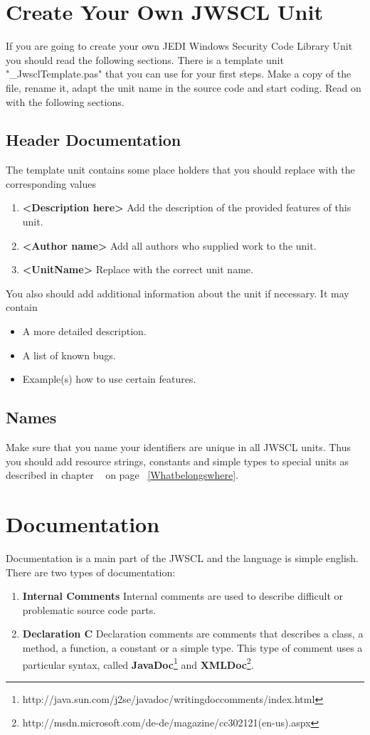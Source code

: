 \documentclass[a4paper,oneside,10pt]{article}
\begin{document}
\section{Create Your Own JWSCL Unit}
If you are going to create your own JEDI Windows Security Code Library Unit you should read the following sections. There is a template unit "\_JwsclTemplate.pas" that you can use for your first steps. Make a copy of the file, rename it, adapt the unit name in the source code and start coding. Read on with the following sections.

\subsection{Header Documentation}
The template unit contains some place holders that you should replace with the corresponding values
\begin{enumerate}
	\item \textbf{<Description here>} Add the description of the provided features of this unit.
  \item \textbf{<Author name>} Add all authors who supplied work to the unit.
  \item \textbf{<UnitName>} Replace with the correct unit name.
\end{enumerate}
You also should add additional information about the unit if necessary. It may contain
\begin{itemize}
  \item A more detailed description.
  \item A list of known bugs.
  \item Example(s) how to use certain features.  
\end{itemize}

\subsection{Names}
Make sure that you name your identifiers are unique in all JWSCL units. Thus you should add resource strings, constants and simple types to special units as described in chapter ~\pageref{Whatbelongswhere} on page ~\ref{Whatbelongswhere}.

\section{Documentation}
Documentation is a main part of the JWSCL and the language is simple english. There are two types of documentation:
\begin{enumerate}
	\item \textbf{Internal Comments} Internal comments are used to describe difficult or problematic source code parts. 

	\item \textbf{Declaration C} Declaration comments are comments that describes a class, a method, a function, a constant or a simple type. This type of comment uses a particular syntax, called \textbf{JavaDoc}\footnote{http://java.sun.com/j2se/javadoc/writingdoccomments/index.html} and \textbf{XMLDoc}\footnote{http://msdn.microsoft.com/de-de/magazine/cc302121(en-us).aspx}.
\end{enumerate}
\end{document}
